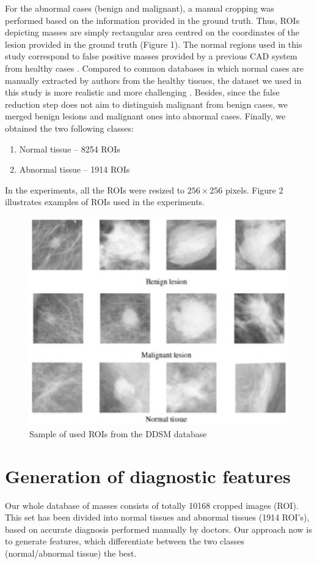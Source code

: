 \documentclass[review,12pt]{elsarticle}
\begin{document}
{For the abnormal cases (benign and malignant),  a manual cropping was performed based on the information provided in the ground truth.
Thus, ROIs depicting masses are simply rectangular area centred on the coordinates of the lesion provided in the ground truth (Figure 1).
 The normal regions  used in this study correspond to false positive masses provided by a previous CAD system from healthy cases \citep{Jiang2015}.
Compared to common databases in which normal cases are manually extracted by authors  from the healthy tissues, the dataset we used in this study is more realistic and more challenging \citep{Jiang2015}.
Besides, since the false reduction step does not aim to distinguish malignant from benign cases, we merged benign lesions and malignant ones into abnormal cases. Finally, we obtained the two following classes:
\begin{enumerate}
  \item Normal tissue – 8254 ROIs
  \item Abnormal tissue – 1914 ROIs
\end{enumerate}
In the experiments, all the ROIs were resized to $256 \times 256$ pixels.
Figure 2 illustrates examples of ROIs used in the experiments.
\begin{figure}
\center
\includegraphics[scale=0.7]{images/ROIsamples.eps}
\caption{Sample of used ROIs from the DDSM database}
\label{fig:ROIsamples}
\end{figure}

\section{Generation of diagnostic features}
Our whole database of masses consists of totally 10168 cropped images (ROI). This set has been divided into normal tissues and abnormal tissues (1914 ROI's), based on accurate diagnosis performed manually by doctors. Our approach now is to generate features, which differentiate between the two classes (normal/abnormal tissue) the best.

}
\end{document}
